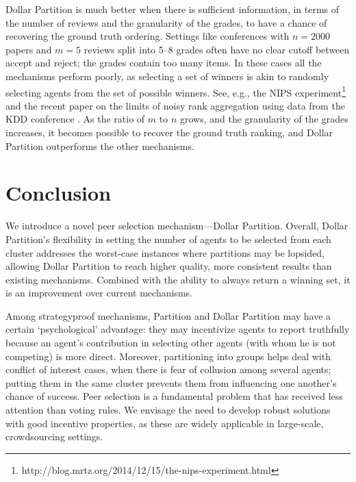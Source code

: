 \documentclass[letterpaper]{article}
\begin{document}
Dollar Partition is much better when there is sufficient information, in terms of the number of reviews and the granularity of the grades, to have a chance of recovering the ground truth ordering. Settings like conferences with $n=2000$ papers and $m=5$ reviews split into 5--8 grades often have no clear cutoff between accept and reject; the grades contain too many items. In these cases all the mechanisms perform poorly, as selecting a set of winners is akin to randomly selecting agents from the set of possible winners. See, e.g., the NIPS experiment\footnote{http://blog.mrtz.org/2014/12/15/the-nips-experiment.html} and the recent paper on the limits of noisy rank aggregation using data from the KDD conference \cite{JoRa15a}. As the ratio of $m$ to $n$ grows, and the granularity of the grades increases, it becomes possible to recover the ground truth ranking, and Dollar Partition outperforms the other mechanisms.







\section{Conclusion}

We introduce a novel peer selection mechanism---Dollar Partition.
Overall, Dollar Partition's flexibility in setting the number of agents to be selected from each cluster addresses the worst-case instances where partitions may be lopsided, allowing Dollar Partition to reach higher quality, more consistent results than existing mechanisms. Combined with the ability to always return a winning set, it is an improvement over current mechanisms.

Among strategyproof mechanisms, Partition and Dollar Partition may
have a certain `psychological' advantage: they may incentivize agents to report truthfully because an agent's contribution in selecting other agents (with whom he is not competing) is more direct.
Moreover, partitioning into groups helps deal with conflict of interest cases, when there is fear of collusion among several agents; putting them in the same cluster prevents them from influencing one another's chance of success.
Peer selection is a fundamental problem that has received less attention than voting rules.  We envisage the need to develop robust solutions with good incentive properties, as these are widely applicable in large-scale, crowdsourcing settings.

\vspace{-0.86mm}
\vspace{-0.74mm}
\end{document}
